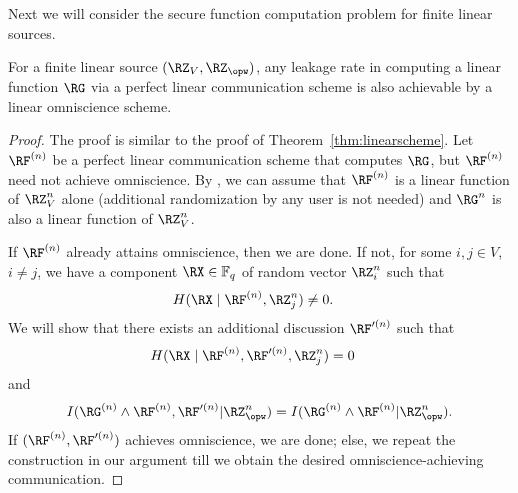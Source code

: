 {Next we will consider the secure function computation problem for finite linear sources.

\begin{theorem}\label{thm:func:linearscheme}
  For a finite linear source $(\RZ_V, \RZ_{\opw})$, any leakage rate in computing a linear function $\RG$ via a perfect linear communication scheme is also achievable by a linear omniscience scheme.
\end{theorem}
\begin{proof} The proof is similar to the proof of Theorem~\ref{thm:linearscheme}. Let $\RF^{(n)}$ be a perfect linear communication scheme that computes $\RG$, but $\RF^{(n)}$ need not achieve omniscience. By  \cite[Theorem~1]{chan19oneshot}, we can assume that $\RF^{(n)}$ is a linear function of $\RZ_V^n$ alone (additional randomization by any user is not needed) and $\RG^n$ is also a linear function of $\RZ_V^n$. 

If $\RF^{(n)}$ already attains omniscience, then we are done. If not, for some $i,j \in V$, $i \ne j$, we have a component $\RX \in \Fq$ of random vector $\RZ_i^{n}$ such that
\begin{align*}
    H(\RX \mid \RF^{(n)}, \RZ_j^n) &\neq 0.
\end{align*}
We will show that there exists an additional discussion $\RF'^{(n)}$ such that
\begin{align}
    H(\RX \mid \RF^{(n)},\RF'^{(n)}, \RZ_j^n) &= 0 \label{eq:func:additional_recov}
\end{align}  and 
\begin{align}
 I(\RG^{(n)} \wedge \RF^{(n)},\RF'^{(n)}| \RZ_{\opw}^n) = I(\RG^{(n)} \wedge \RF^{(n)}| \RZ_{\opw}^n).\label{eq:func:additional_secrecy}
\end{align}
If $(\RF^{(n)},\RF'^{(n)})$ achieves omniscience, we are done; else, we repeat the construction in our argument till we obtain the desired omniscience-achieving communication.


\end{proof}}
